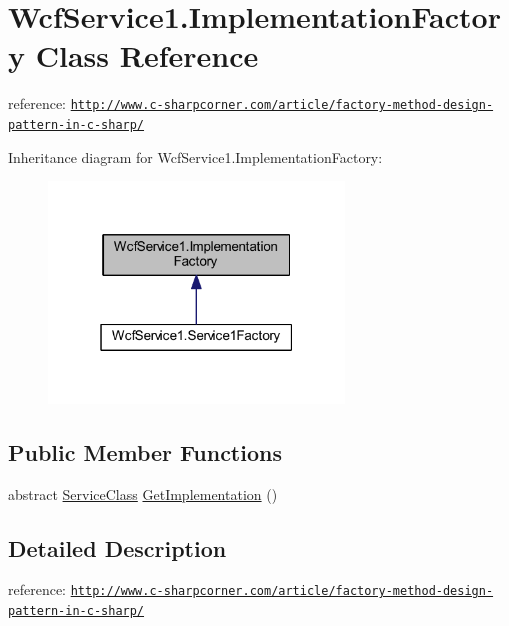 \hypertarget{class_wcf_service1_1_1_implementation_factory}{}\section{Wcf\+Service1.\+Implementation\+Factory Class Reference}
\label{class_wcf_service1_1_1_implementation_factory}


reference\+: \href{http://www.c-sharpcorner.com/article/factory-method-design-pattern-in-c-sharp/}{\tt http\+://www.\+c-\/sharpcorner.\+com/article/factory-\/method-\/design-\/pattern-\/in-\/c-\/sharp/}  




Inheritance diagram for Wcf\+Service1.\+Implementation\+Factory\+:\nopagebreak
\begin{figure}[H]
\begin{center}
\leavevmode
\includegraphics[width=223pt]{class_wcf_service1_1_1_implementation_factory__inherit__graph}
\end{center}
\end{figure}
\subsection*{Public Member Functions}
\begin{DoxyCompactItemize}
\item 
abstract \hyperlink{class_wcf_service1_1_1_service_class}{Service\+Class} \hyperlink{class_wcf_service1_1_1_implementation_factory_ae88b463f0c749ded38d5cbcf2c1dd7cb}{Get\+Implementation} ()
\end{DoxyCompactItemize}


\subsection{Detailed Description}
reference\+: \href{http://www.c-sharpcorner.com/article/factory-method-design-pattern-in-c-sharp/}{\tt http\+://www.\+c-\/sharpcorner.\+com/article/factory-\/method-\/design-\/pattern-\/in-\/c-\/sharp/} 



